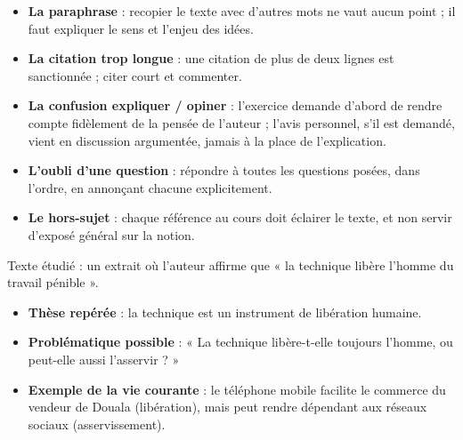 \documentclass[11pt]{article}
\begin{document}
\begin{attention}
\begin{itemize}
\item \textbf{La paraphrase} : recopier le texte avec d'autres mots ne vaut aucun point ; il faut expliquer le sens et l'enjeu des idées.
\item \textbf{La citation trop longue} : une citation de plus de deux lignes est sanctionnée ; citer court et commenter.
\item \textbf{La confusion expliquer / opiner} : l'exercice demande d'abord de rendre compte fidèlement de la pensée de l'auteur ; l'avis personnel, s'il est demandé, vient en discussion argumentée, jamais à la place de l'explication.
\item \textbf{L'oubli d'une question} : répondre à toutes les questions posées, dans l'ordre, en annonçant chacune explicitement.
\item \textbf{Le hors-sujet} : chaque référence au cours doit éclairer le texte, et non servir d'exposé général sur la notion.
\end{itemize}
\end{attention}

\begin{exemplebox}
Texte étudié : un extrait où l'auteur affirme que « la technique libère l'homme du travail pénible ».
\begin{itemize}
\item \textbf{Thèse repérée} : la technique est un instrument de libération humaine.
\item \textbf{Problématique possible} : « La technique libère-t-elle toujours l'homme, ou peut-elle aussi l'asservir ? »
\item \textbf{Exemple de la vie courante} : le téléphone mobile facilite le commerce du vendeur de Douala (libération), mais peut rendre dépendant aux réseaux sociaux (asservissement).
\end{itemize}
\end{exemplebox}
\end{document}
